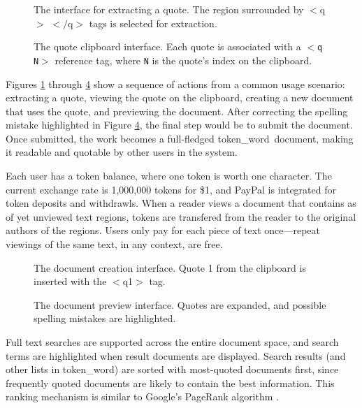 \documentclass{acm_proc_article-sp}
\newcommand{\tokenWord}{token\_word}
\begin{document}
\begin{figure}[t]
\centering
{}
\caption{The interface for extracting a quote.  The region surrounded by $<$q$>$ $<$$/$q$>$ tags is selected for extraction.}
\label{fig:extractQuote}
\end{figure}

\begin{figure}[t]
\centering
{}
\caption{The quote clipboard interface.  Each quote is associated with a $<$\texttt{q N}$>$ reference tag, where \texttt{N} is the quote's index on the clipboard.}
\label{fig:quoteClipboard}
\end{figure}

Figures \ref{fig:extractQuote} through \ref{fig:docPreview} show a sequence of actions from a common usage scenario:  extracting a quote, viewing the quote on the clipboard, creating a new document that uses the quote, and previewing the document.
After correcting the spelling mistake highlighted in Figure \ref{fig:docPreview}, the final step would be to submit the document.
Once submitted, the work becomes a full-fledged \tokenWord \  document, making it readable and quotable by other users in the system.


Each user has a token balance, where one token is worth one character.
The current exchange rate is 1,000,000 tokens for \$1, and PayPal is integrated for token deposits and withdrawls.
When a reader views a document that contains as of yet unviewed text regions, tokens are transfered from the reader to the original authors of the regions.
Users only pay for each piece of text once---repeat viewings of the same text, in any context, are free.
\begin{figure}[t]
\centering
{}
\caption{The document creation interface. Quote 1 from the clipboard is inserted with the $<$q1$>$ tag.}
\label{fig:docCreate}
\end{figure}

\begin{figure}[t]
\centering
{}
\caption{The document preview interface.  Quotes are expanded, and possible spelling mistakes are highlighted.}
\label{fig:docPreview}
\end{figure}

Full text searches are supported across the entire document space, and search terms are highlighted when result documents are displayed.
Search results (and other lists in \tokenWord) are sorted with most-quoted documents first, since frequently quoted documents are likely to contain the best information.
This ranking mechanism is similar to Google's PageRank algorithm \cite{Brin1998}. 
\end{document}

